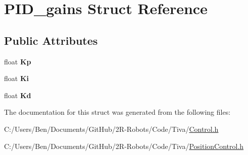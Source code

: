 \hypertarget{struct_p_i_d__gains}{}\section{P\+I\+D\+\_\+gains Struct Reference}
\label{struct_p_i_d__gains}
\subsection*{Public Attributes}
\begin{DoxyCompactItemize}
\item 
\mbox{\label{struct_p_i_d__gains_a90cbc875589c1f344a87450e6075d08b}} 
float {\bfseries Kp}
\item 
\mbox{\label{struct_p_i_d__gains_a4ff56f74a12ab95c99b0a167dc410e14}} 
float {\bfseries Ki}
\item 
\mbox{\label{struct_p_i_d__gains_af9e08a2cf341a54cf815615cdce41c34}} 
float {\bfseries Kd}
\end{DoxyCompactItemize}


The documentation for this struct was generated from the following files\+:\begin{DoxyCompactItemize}
\item 
C\+:/\+Users/\+Ben/\+Documents/\+Git\+Hub/2\+R-\/\+Robots/\+Code/\+Tiva/\mbox{\hyperlink{_control_8h}{Control.\+h}}\item 
C\+:/\+Users/\+Ben/\+Documents/\+Git\+Hub/2\+R-\/\+Robots/\+Code/\+Tiva/\mbox{\hyperlink{_position_control_8h}{Position\+Control.\+h}}\end{DoxyCompactItemize}
